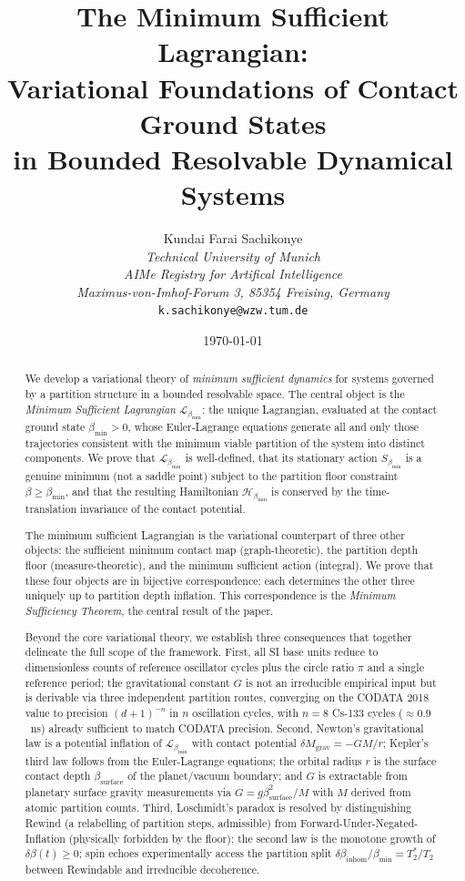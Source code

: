 \documentclass[11pt,twocolumn,a4paper]{article}
\title{\textbf{The Minimum Sufficient Lagrangian:\\
Variational Foundations of Contact Ground States\\
in Bounded Resolvable Dynamical Systems}}
\author{Kundai Farai Sachikonye\\
\textit{Technical University of Munich}\\
\textit{AIMe Registry for Artifical Intelligence}\\
\textit{Maximus-von-Imhof-Forum 3, 85354 Freising, Germany}\\
\texttt{k.sachikonye@wzw.tum.de}}
\date{\today}
\theoremstyle{plain}
\theoremstyle{definition}
\theoremstyle{remark}
\newcommand{\bmin}{\beta_{\min}}
\newcommand{\Lmin}{\mathcal{L}_{\bmin}}
\newcommand{\Smin}{S_{\bmin}}
\newcommand{\Hmin}{\mathcal{H}_{\bmin}}
\begin{document}
\maketitle

\begin{abstract}

We develop a variational theory of \emph{minimum sufficient dynamics} for
systems governed by a partition structure in a bounded resolvable space. The
central object is the \emph{Minimum Sufficient Lagrangian} $\Lmin$: the unique
Lagrangian, evaluated at the contact ground state $\bmin > 0$, whose
Euler-Lagrange equations generate all and only those trajectories consistent with
the minimum viable partition of the system into distinct components. We prove
that $\Lmin$ is well-defined, that its stationary action $\Smin$ is a genuine
minimum (not a saddle point) subject to the partition floor constraint
$\beta \geq \bmin$, and that the resulting Hamiltonian $\Hmin$ is conserved
by the time-translation invariance of the contact potential.

The minimum sufficient Lagrangian is the variational counterpart of three other
objects: the sufficient minimum contact map (graph-theoretic), the partition
depth floor (measure-theoretic), and the minimum sufficient action (integral).
We prove that these four objects are in bijective correspondence: each
determines the other three uniquely up to partition depth inflation. This
correspondence is the \emph{Minimum Sufficiency Theorem}, the central result of
the paper.

Beyond the core variational theory, we establish three consequences that together
delineate the full scope of the framework. First, all SI base units reduce to
dimensionless counts of reference oscillator cycles plus the circle ratio $\pi$
and a single reference period; the gravitational constant $G$ is not an
irreducible empirical input but is derivable via three independent partition
routes, converging on the CODATA 2018 value to precision $(d+1)^{-n}$ in $n$
oscillation cycles, with $n = 8$ Cs-133 cycles ($\approx 0.9$~ns) already
sufficient to match CODATA precision. Second, Newton's gravitational law is a
potential inflation of $\Lmin$ with contact potential $\delta M_{\mathrm{grav}}
= -GM/r$; Kepler's third law follows from the Euler-Lagrange equations; the
orbital radius $r$ is the surface contact depth $\beta_{\mathrm{surface}}$ of
the planet/vacuum boundary; and $G$ is extractable from planetary surface
gravity measurements via $G = g\beta_{\mathrm{surface}}^2/M$ with $M$ derived
from atomic partition counts. Third, Loschmidt's paradox is resolved by
distinguishing Rewind (a relabelling of partition steps, admissible) from
Forward-Under-Negated-Inflation (physically forbidden by the floor); the second
law is the monotone growth of $\delta\beta(t) \geq 0$; spin echoes
experimentally access the partition split $\delta\beta_{\mathrm{inhom}}/\bmin =
T_2^*/T_2$ between Rewindable and irreducible decoherence.


\end{abstract}
\end{document}
